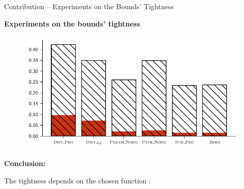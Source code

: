 \documentclass{slides}
\begin{document}
\begin{xframe}{Contribution -- {\small Experiments on the Bounds' Tightness}}

\vspace{-0.3cm}

\begin{center}
{\bf Experiments on the bounds' tightness}
\end{center}

\vspace{-0.2cm}

\begin{minipage}{0.8\linewidth}
\begin{figure}[H]
    \centering
    \includegraphics[width=0.9\linewidth]{figures/gap_mnist_min.pdf}
\end{figure}
\end{minipage}
\hfill
\begin{minipage}{0.19\linewidth}
\begin{figure}
\hspace{-0.6cm}
\end{figure}
\end{minipage}

\vspace{0.3cm}

{\bf Conclusion:}
\begin{xitemize}
\item The tightness depends on the chosen function $\comp$
\end{xitemize}

\end{xframe}

\end{document}
